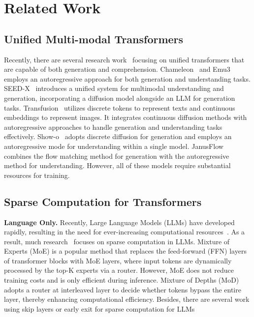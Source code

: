 \section{Related Work}
\label{sec:related_work}

\subsection{Unified Multi-modal Transformers}
Recently, there are several research work~\cite{seed-x,wu2023next,team2024chameleon,showo,lwm,sun2023emu,transfusion,CoDI,dreamllm,emu3,janusflow,luminamgpt,liquid,llamafusion,anil2023gemini,tokenflow,synergen,Orthus,omniflow} focusing on unified transformers that are capable of both generation and comprehension. Chameleon~\cite{team2024chameleon} and Emu3~\cite{emu3} employs an autoregressive approach for both generation and understanding tasks. SEED-X~\cite{seed-x} introduces a unified system for multimodal understanding and generation, incorporating a diffusion model alongside an LLM for generation tasks. Transfusion~\cite{transfusion} utilizes discrete tokens to represent texts and continuous embeddings to represent images. It integrates continuous diffusion methods with autoregressive approaches to handle generation and understanding tasks effectively. Show-o~\cite{showo} adopts discrete diffusion for generation and employs an autoregressive mode for understanding within a single model. JanusFlow~\cite{janusflow} combines the flow matching method for generation with the autoregressive method for understanding. However, all of these models require substantial resources for training. 






\subsection{Sparse Computation for Transformers}
\textbf{Language Only.} Recently, Large Language Models (LLMs) have developed rapidly, resulting in the need for ever-increasing computational resources~\cite{llama,phi1.5,phi3,gpt3,gpt1}. As a result, much research~\cite{kvcache,layerskip,imageworth,attentionsink} focuses on sparse computation in LLMs. Mixture of Experts (MoE)\cite{surveymoe,openmoe,deepseekmoe,mixturalmoe} is a popular method that replaces the feed-forward (FFN) layers of transformer blocks with MoE layers, where input tokens are dynamically processed by the top-K experts via a router. However, MoE does not reduce training costs and is only efficient during inference. Mixture of Depths (MoD)\cite{mod} adopts a router at interleaved layer to decide whether tokens bypass the entire layer, thereby enhancing computational efficiency. Besides, there are several work using skip layers or early exit for sparse computation for LLMs~\cite{skiplayer,skipdecoder,earlyexit1}



